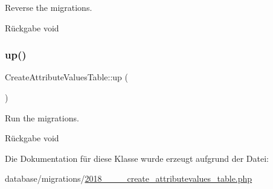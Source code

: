 Reverse the migrations.

\begin{DoxyReturn}{Rückgabe}
void 
\end{DoxyReturn}
\mbox{\label{classCreateAttributeValuesTable_a289369a7bdc05071c9518281d29abd4e}} 
\subsubsection{\texorpdfstring{up()}{up()}}
{\footnotesize\ttfamily Create\+Attribute\+Values\+Table\+::up (\begin{DoxyParamCaption}{ }\end{DoxyParamCaption})}

Run the migrations.

\begin{DoxyReturn}{Rückgabe}
void 
\end{DoxyReturn}


Die Dokumentation für diese Klasse wurde erzeugt aufgrund der Datei\+:\begin{DoxyCompactItemize}
\item 
database/migrations/\hyperlink{2018__06__15__144445__create__attributevalues__table_8php}{2018\+\_\+\_\+\_\+\_\+create\+\_\+attributevalues\+\_\+table.\+php}\end{DoxyCompactItemize}
